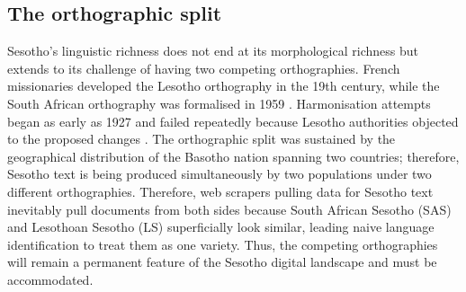 \documentclass[11pt,a4paper]{article}
\begin{document}
\subsection{The orthographic split}
Sesotho's linguistic richness does not end at its morphological richness but extends to its challenge of having two competing orthographies. French missionaries developed the Lesotho orthography in the 19th century, while the South African orthography was formalised in 1959 \citep{makutoane2022people}. Harmonisation attempts began as early as 1927 and failed repeatedly because Lesotho authorities objected to the proposed changes \citep{matlosa2017sesotho}. The orthographic split was sustained by the geographical distribution of the Basotho nation spanning two countries; therefore, Sesotho text is being produced simultaneously by two populations under two different orthographies. Therefore, web scrapers pulling data for Sesotho text inevitably pull documents from both sides because South African Sesotho (SAS) and Lesothoan Sesotho (LS) superficially look similar, leading naive language identification to treat them as one variety. Thus, the competing orthographies will remain a permanent feature of the Sesotho digital landscape and must be accommodated. 
\end{document}
